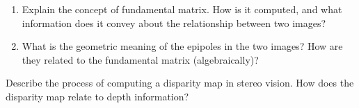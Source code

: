 \documentclass[12pt]{article}
\begin{document}
    \begin{ejercicio}[8 points]
        \begin{enumerate}
            \item[a.] Explain the concept of fundamental matrix. How is it computed, and what information does it convey about the relationship between two images?
            \item[b.] What is the geometric meaning of the epipoles in the two images? How are they related to the fundamental matrix (algebraically)?
        \end{enumerate}
    \end{ejercicio}

    \begin{ejercicio}[8 points]
        Describe the process of computing a disparity map in stereo vision. How does the disparity map relate to depth information?
    \end{ejercicio}
\end{document}

